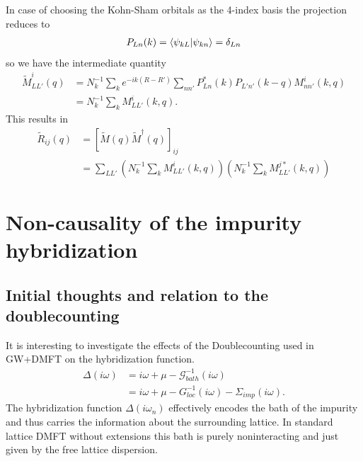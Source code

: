 \documentclass[12pt,a4paper]{scrartcl}
\numberwithin{equation}{section}
\begin{document}
In case of choosing the Kohn-Sham orbitals as the 4-index basis the projection reduces to
\begin{align}
 P_{Ln}(k) = \braket{ \psi_{kL} | \psi_{kn} } = \delta_{Ln}
\end{align}
so we have the intermediate quantity
\begin{align}
 \tilde{M}^i_{LL'}(q)
 &= N_k^{-1} \sum_k e^{-ik(R-R')} \sum_{nn'}  P^*_{Ln}(k)  P_{L'n'}(k-q) M^i_{nn'}(k,q) \\
 &= N_k^{-1} \sum_k  M^i_{LL'}(k,q) .
\end{align}
This results in 
\begin{align}
 \tilde{R}_{ij}(q) &= \left[ \tilde{M}(q) \tilde{M}^{\dagger}(q)\right]_{ij} \\
 &= \sum_{LL'}\left( N_k^{-1} \sum_k M^i_{LL'}(k,q)  \right) 
    \left( N_k^{-1} \sum_k  M^{j*}_{LL'}(k,q)  \right)
\end{align}








\clearpage






\section{Non-causality of the impurity hybridization}
\label{sec:noncausal_hyb}

\subsection{Initial thoughts and relation to the doublecounting}

It is interesting to investigate the effects of the Doublecounting
used in GW+DMFT on the hybridization function.
\begin{align}
\Delta(i\omega) &= i\omega + \mu - \mathscr{G}_{bath}^{-1}(i\omega) \\
&= i\omega + \mu - G_{loc}^{-1}(i\omega) - \Sigma_{imp}(i\omega).
\end{align}
The hybridization function $\Delta(i\omega_n)$ effectively encodes the bath
of the impurity and thus carries the information about the surrounding lattice.
In standard lattice DMFT without extensions this bath is purely noninteracting
and just given by the free lattice dispersion.
\end{document}
